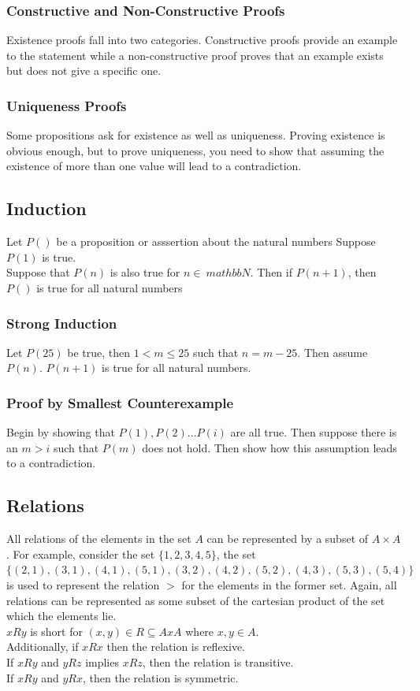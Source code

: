 \documentclass[a4paper,11pt]{article}
\begin{document}
\subsubsection{Constructive and Non-Constructive Proofs}
Existence proofs fall into two categories. Constructive proofs provide an example to the statement while a non-constructive proof proves that an example exists but does not give a specific one.

\subsubsection{Uniqueness Proofs}
Some propositions ask for existence as well as uniqueness. Proving existence is
obvious enough, but to prove uniqueness, you need to show that assuming the existence of more than one value will lead to a contradiction.

\subsection{Induction}
Let $P()$ be a proposition or asssertion about the natural numbers
Suppose $P(1)$ is true.\\
Suppose that $P(n)$ is also true for $n \in \ mathbb{N}$.
Then if $P(n+1)$, then $P()$ is true for all natural numbers

\subsubsection{Strong Induction}
Let $P(25)$ be true, then $1 < m \leq 25$ such that $n=m-25$. Then assume $P(n)$. $P(n+1)$ is true for all natural numbers.

\subsubsection{Proof by Smallest Counterexample}
Begin by showing that $P(1), P(2)\dots P(i)$ are all true. Then suppose there is an $m>i$ such that $P(m)$ does not hold. Then show how this assumption leads to a contradiction.

\subsection{Relations}
All relations of the elements in the set $A$ can be represented by a subset of $A \times A$. For example, consider the set $\{1,2,3,4,5\}$, the set\\
$\{(2,1), (3,1), (4,1), (5, 1), (3, 2), (4, 2), (5, 2), (4, 3), (5, 3), (5, 4)\}$\\ is used to represent the relation $>$ for the elements in the former set.
Again, all relations can be represented as some subset of the cartesian product of the set which the elements lie.\\
$xRy$ is short for $(x,y) \in R \subseteq AxA$ where $x, y \in A$.\\
Additionally, if $xRx$ then the relation is reflexive.\\
If $xRy$ and $yRz$ implies $xRz$, then the relation is transitive.\\
If $xRy$ and $yRx$, then the relation is symmetric.
\end{document}
